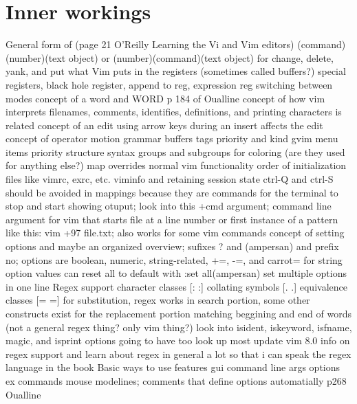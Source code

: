 \documentclass[12pt]{book}
\begin{document}
\section{Inner workings}
General form of (page 21 O'Reilly Learning the Vi and Vim editors) (command)(number)(text object) or (number)(command)(text object) for change, delete, yank, and put
what Vim puts in the registers (sometimes called buffers?) special registers, black hole register, append to reg, expression reg
switching between modes
concept of a word and WORD p 184 of Oualline
  concept of how vim interprets filenames, comments, identifies, definitions, and printing characters is related
concept of an edit
  using arrow keys during an insert affects the edit
concept of operator motion grammar
buffers
tags priority and kind
gvim menu items priority structure
syntax groups and subgroups for coloring (are they used for anything else?)
map overrides normal vim functionality
order of initialization files like vimrc, exrc, etc.
viminfo and retaining session state
ctrl-Q and ctrl-S should be avoided in mappings because they are commands for the terminal to stop and start showing otuput; look into this
+cmd argument; command line argument for vim that starts file at a line number or first instance of a pattern like this: vim +97 file.txt; also works for some vim commands
concept of setting options and maybe an organized overview; sufixes ? and (ampersan) and prefix no;
  options are boolean, numeric, string-related,
    +=, -=, and carrot= for string option values
    can reset all to default with :set all(ampersan)
    set multiple options in one line
Regex support
  character classes [: :]
  collating symbols [. .]
  equivalence classes [= =]
  for substitution, regex works in search portion, some other constructs exist for the replacement portion
  matching beggining and end of words (not a general regex thing? only vim thing?)
  look into isident, iskeyword, isfname, magic, and isprint options
  going to have too look up most update vim 8.0 info on regex support and learn about regex in general a lot so that i can speak the regex language in the book
Basic ways to use features
  gui
  command line args
  options
  ex commands
  mouse
	modelines; comments that define options automatially p268 Oualline
\end{document}
